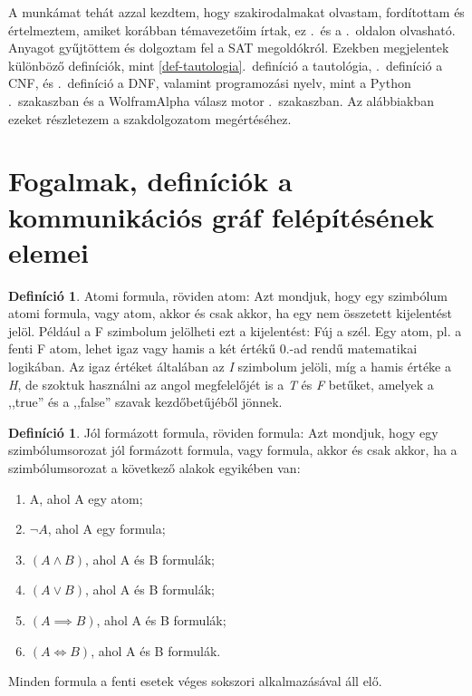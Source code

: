 \documentclass[
]{thesis-ekf}
\theoremstyle{definition}
\newtheorem{definicio}[tetel]{Definíció}
\theoremstyle{remark}
\begin{document}
A munkámat tehát azzal kezdtem, hogy szakirodalmakat olvastam, fordítottam és értelmeztem, amiket korábban témavezetőim írtak, ez \az{\pageref{ssec-fogalmak}}.~és a \az{\pageref{sec-szakirodalom-forditas}}.~oldalon olvasható.
Anyagot gyűjtöttem és dolgoztam fel a \textsc{SAT} megoldókról.
Ezekben megjelentek különböző definíciók, mint \ref{def-tautologia}.~definíció a tautológia, \az{\ref{def-cnf}}.~definíció a \textsc{CNF}, és \az{\ref{def-dnf}}.~definíció a \textsc{DNF}, valamint programozási nyelv, mint a Python \az{\ref{kif-python-programnyelv}}.~szakaszban és a WolframAlpha válasz motor \az{\ref{kif-wolframalpha-hasznalata}}.~szakaszban. Az alábbiakban ezeket részletezem a szakdolgozatom megértéséhez.
	
\section{Fogalmak, definíciók a kommunikációs gráf felépítésének elemei}\label{sec-alap-fogalmak}

\begin{definicio}
	Atomi formula, röviden atom: Azt mondjuk, hogy egy szimbólum atomi formula, vagy atom, akkor és csak akkor, ha egy nem összetett kijelentést jelöl. Például a F szimbolum jelölheti ezt a kijelentést: Fúj a szél. Egy atom, pl. a fenti F atom, lehet igaz vagy hamis a két értékű 0.-ad rendű matematikai logikában. Az igaz értéket általában az \emph{I} szimbolum jelöli, míg a hamis értéke a \emph{H}, de szoktuk használni az angol megfelelőjét is a \emph{T} és \emph{F} betűket, amelyek a ,,true'' és a ,,false'' szavak kezdőbetűjéből jönnek.
\end{definicio}

\begin{definicio}		
	Jól formázott formula, röviden formula: Azt mondjuk, hogy egy szimbólumsorozat jól formázott formula, vagy formula, akkor és csak akkor, ha a szimbólumsorozat a következő alakok egyikében van:
	\begin{enumerate}[label=\textit{(\alph*)}]
		\item A, ahol A egy atom;
		\item $ \neg A $, ahol A egy formula;
		\item $ (A \wedge B) $, ahol A és B formulák;
		\item $ (A \vee B) $, ahol A és B formulák;
		\item $ (A \implies B) $, ahol A és B formulák;
		\item $ (A \Leftrightarrow B) $, ahol A és B formulák.
	\end{enumerate}
	Minden formula a fenti esetek véges sokszori alkalmazásával áll elő.
\end{definicio}
\end{document}
